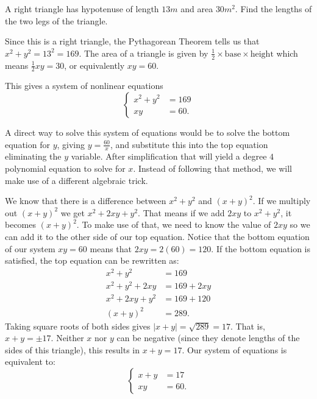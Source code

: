 \documentclass[nooutcomes]{ximera}
\begin{document}
	\begin{exercise}
		A right triangle has hypotenuse of length $13 m$ and area $30 m^2$. Find the lengths of the two legs of the triangle.
		\begin{image}[2in]
		\end{image}
		\begin{explanation}
			
			Since this is a right triangle, the Pythagorean Theorem tells us that $x^2 + y^2 = 13^2 = 169$.
			The area of a triangle is given by $\frac{1}{2}\times \text{base} \times \text{height}$ which means
			$\frac{1}{2}xy = 30$, or equivalently $xy = 60$.

			This gives a system of nonlinear equations
			$$	\begin{cases}
				x^2+y^2 &= 169\\
				xy &= 60.
			\end{cases}	$$
			
			A direct way to solve this system of equations would be to solve the bottom equation for $y$, giving $y = \frac{60}{x}$, and substitute this into the top equation
			eliminating the $y$ variable. After simplification that will yield a degree $4$ polynomial equation to solve for $x$. Instead of following that method, we will make 
			use of a different algebraic trick.
			
			We know that there is a difference between $x^2 + y^2$ and $(x+y)^2$. If we multiply out $(x+y)^2$ we get $x^2 + 2xy + y^2$. That means if we add $2xy$
			to $x^2 + y^2$, it becomes $(x+y)^2$. To make use of  that, we need to know the value of $2xy$ so we can add it to the other side of our top equation.
			Notice that the bottom equation of our system $xy=60$ means that $2xy = 2(60)=120$. If the bottom equation is satisfied, the top equation can be
			rewritten as:
			\begin{align*}
				x^2 + y^2 &= 169\\
				x^2 + y^2 + 2xy &= 169 + 2xy\\
				x^2 + 2xy + y^2 &= 169 + 120\\				
				\left( x + y \right)^2 &= 289.
			\end{align*}
			Taking square roots of both sides gives $|x+y| = \sqrt{289}=17$. That is, $x+y = \pm 17$.
			Neither $x$ nor $y$ can be negative (since they denote lengths of the sides of this triangle), this results in $x+y = 17$.
			Our system of equations is equivalent to:
			$$	\begin{cases}
				x + y &= 17\\
				xy &= 60.
			\end{cases}	$$
			

\end{explanation}
\end{exercise}
\end{document}
